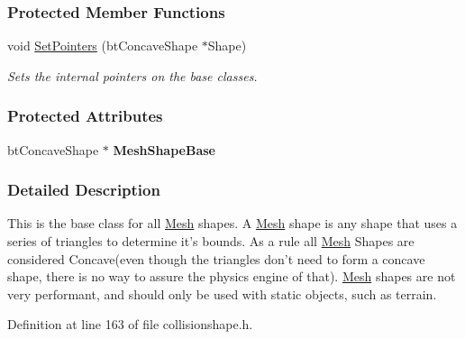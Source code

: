 \subsubsection*{Protected Member Functions}
\begin{DoxyCompactItemize}
\item 
\hypertarget{classphys_1_1MeshCollisionShape_a889f7ca8a894243ec3e361c27d4c3d8a}{
void \hyperlink{classphys_1_1MeshCollisionShape_a889f7ca8a894243ec3e361c27d4c3d8a}{SetPointers} (btConcaveShape $\ast$Shape)}
\label{classphys_1_1MeshCollisionShape_a889f7ca8a894243ec3e361c27d4c3d8a}

\begin{DoxyCompactList}\small\item\em Sets the internal pointers on the base classes. \item\end{DoxyCompactList}\end{DoxyCompactItemize}
\subsubsection*{Protected Attributes}
\begin{DoxyCompactItemize}
\item 
\hypertarget{classphys_1_1MeshCollisionShape_a534e45627f93eb47ac14cdff9ba30278}{
btConcaveShape $\ast$ {\bfseries MeshShapeBase}}
\label{classphys_1_1MeshCollisionShape_a534e45627f93eb47ac14cdff9ba30278}

\end{DoxyCompactItemize}


\subsubsection{Detailed Description}
This is the base class for all \hyperlink{classphys_1_1Mesh}{Mesh} shapes. A \hyperlink{classphys_1_1Mesh}{Mesh} shape is any shape that uses a series of triangles to determine it's bounds. As a rule all \hyperlink{classphys_1_1Mesh}{Mesh} Shapes are considered Concave(even though the triangles don't need to form a concave shape, there is no way to assure the physics engine of that). \hyperlink{classphys_1_1Mesh}{Mesh} shapes are not very performant, and should only be used with static objects, such as terrain. 

Definition at line 163 of file collisionshape.h.



